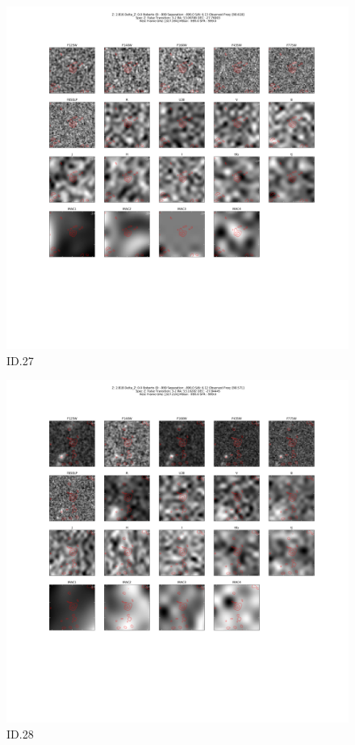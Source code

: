 \begin{figure}[tbp]
\centering \includegraphics[width=120mm]{Matched/ASPECS_Cutout_27.png}
\caption{ID.27}
\label{fig:Match_Three}
\end{figure}

\begin{figure}[tbp]
\centering \includegraphics[width=120mm]{Matched/ASPECS_Cutout_28.png}
\caption{ID.28}
\label{fig:Match_Three}
\end{figure}

